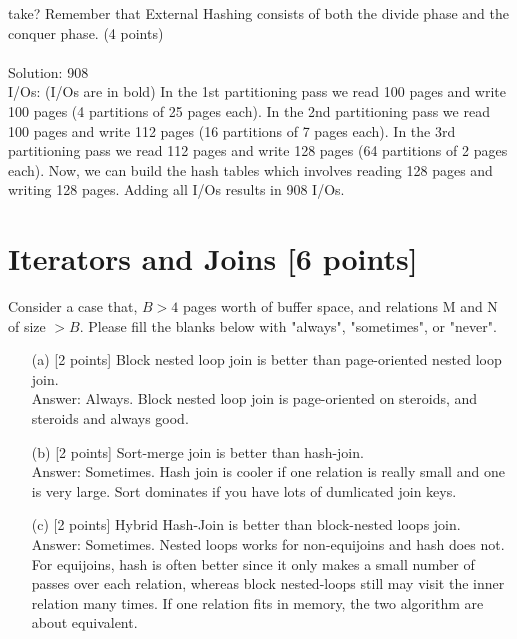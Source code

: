 \documentclass[10pt]{article}
\begin{document}
\begin{itemize}
\begin{enumerate}
take? Remember that External Hashing consists of both the divide phase and the conquer phase. (4 points)
        \\
        \\
{\color{red}Solution: 908 \\
I/Os: (I/Os are in bold) In the 1st partitioning pass we read 100 pages and write 100 pages (4 partitions of 25 pages each). In the 2nd partitioning pass we read 100 pages and write 112 pages (16 partitions of 7 pages each). In the 3rd partitioning pass we read 112 pages and write 128 pages (64 partitions of 2 pages each). Now, we can build the hash tables which involves reading 128 pages and writing 128 pages. Adding all I/Os results in 908 I/Os.}
        \\
    \end{enumerate}
\end{itemize}




\section{\textbf{Iterators and Joins    [6 points]}}
Consider a case that, $B > 4$ pages worth of buffer space, and relations M and N of size $> B$. Please fill the blanks below with "always", "sometimes", or "never".
\begin{enumerate}
    \item[(a)] [2 points] Block nested loop join is \underline{\quad\quad\quad\quad} better than page-oriented nested loop join.\\
        {\color{red} Answer: Always. Block nested loop join is page-oriented on steroids, and steroids and always good.}
    \item[(b)] [2 points] Sort-merge join is \underline{\quad\quad\quad\quad} better than hash-join.\\
        {\color{red} Answer: Sometimes. Hash join is cooler if one relation is really small and one is very large. Sort dominates if you have lots of dumlicated join keys.}
    \item[(c)] [2 points] Hybrid Hash-Join is \underline{\quad\quad\quad\quad} better than block-nested loops join.\\
        {\color{red} Answer: Sometimes. Nested loops works for non-equijoins and hash does not. For equijoins, hash is often better since it only makes a small number of passes over each relation, whereas block nested-loops still may visit the inner relation many times. If one relation fits in memory, the two algorithm are about equivalent.}
\end{enumerate}
\end{document}
